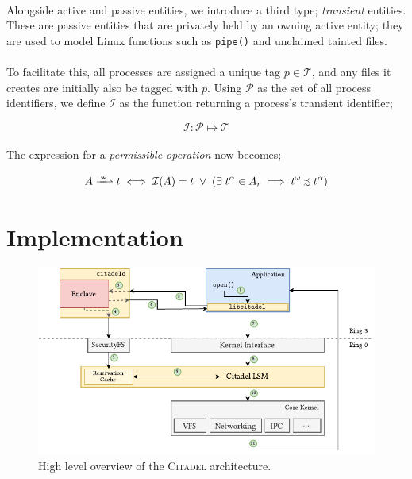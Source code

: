 \paragraph{} Alongside active and passive entities, we introduce a third type; \textit{transient} entities. These are passive entities that are privately held by an owning active entity; they are used to model Linux functions such as \texttt{pipe()} and unclaimed tainted files.

\paragraph{} To facilitate this, all processes are assigned a unique tag $p \in \mathcal{T}$, and any files it creates are initially also be tagged with $p$. Using $\mathcal{P}$ as the set of all process identifiers, we define $\mathcal{I}$ as the function returning a process's transient identifier;

\vspace{-5mm}
\begin{equation}
    \mathcal{I}: \mathcal{P} \mapsto \mathcal{T}
\end{equation}

\paragraph{} The expression for a \textit{permissible operation} now becomes;

\vspace{-5mm}
\begin{equation}
    A \xrightharpoonup{\;\omega\;} t \iff \mathcal{I}(A) = t \;\lor\; (\exists \; t^{\alpha} \in A_r \implies t^{\omega} \sprecsim t^{\alpha})
\end{equation}

\clearpage
\section{Implementation}

\begin{figure}[]
    \centering
    \includegraphics[width=\linewidth]{figures/OverallArchitecture.pdf}
    \caption{High level overview of the \textsc{Citadel} architecture.}
    \vspace{-5mm}
    \label{fig:citadel-overview}
    \vspace{5mm}
\end{figure}

